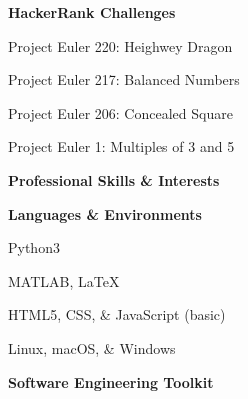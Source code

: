 \documentclass[letterpaper,final]{memoir}
\newcommand{\Sep}{\vspace{1.0em}}
\newcommand{\SmallSep}{\vspace{0.4em}}
\newcommand{\CVSection}[1]
	{\LARGE\textbf{#1}\par
	\SmallSep\normalsize}
\newcommand{\CVItem}[1]
	{\textbf{\color{Blue} #1}}
\begin{document}
\CVItem{HackerRank Challenges}
\SmallSep

\begin{multicols}{2}

    \begin{compactitem}[\color{Blue}$\circ$]

        
        \item Project Euler 220:    Heighwey Dragon
        
        \item Project Euler 217:    Balanced Numbers

        \item Project Euler 206:    Concealed Square

        \item Project Euler 1:      Multiples of 3 and 5

       
    \end{compactitem}

\end{multicols}

\Sep


\notoserif \CVSection{Professional Skills \& Interests}
\normalfont
\SmallSep

\CVItem{Languages \& Environments}
\Sep

\begin{multicols}{1}

    \begin{compactitem}[\color{Blue}$\circ$]
		
		\item Python3
       

        \item MATLAB, LaTeX
		

        \item HTML5, CSS, \& JavaScript (basic)
        

        \item Linux, macOS, \& Windows
       
    
	\end{compactitem}

\end{multicols}

\Sep

\CVItem{Software Engineering Toolkit}
\Sep
\end{document}
